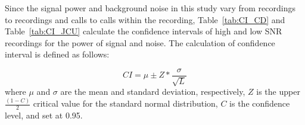 \begin{table}[htb!]
\centering
\caption[Averaged parameters of CD]{Averaged parameters of ten syllables of six frog species (David Stewart's CD)}
\label{tab:cd_parameter}
\end{table}




Since the signal power and background noise in this study vary from recordings to recordings and calls to calls within the recording, Table~\ref{tab:CI_CD} and Table~\ref{tab:CI_JCU} calculate the confidence intervals of high and low SNR recordings for the power of signal and noise. The calculation of confidence interval is defined as follows:

\begin{equation}
CI=\mu \pm Z*\frac{\sigma}{\sqrt{L}}
\end{equation}
where $\mu$ and $\sigma$ are the mean and standard deviation, respectively, $Z$ is the upper $\frac{(1-C)}{2}$ critical value for the standard normal distribution, $C$ is the confidence level, and set at 0.95.




